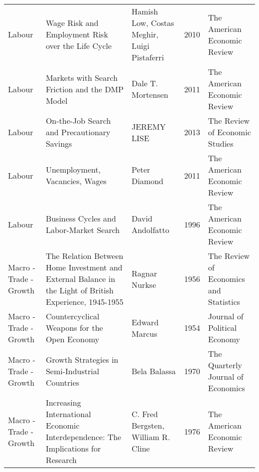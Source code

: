 \begin{xltabular}[p]{\hsize}{sYsrs}
                         Labour &                                                                               Wage Risk and Employment Risk over the Life Cycle &                   Hamish Low, Costas Meghir, Luigi Pistaferri & 2010 &           The American Economic Review \\
                         Labour &                                                                                  Markets with Search Friction and the DMP Model &                                             Dale T. Mortensen & 2011 &           The American Economic Review \\
                         Labour &                                                                                     On-the-Job Search and Precautionary Savings &                                                   JEREMY LISE & 2013 &         The Review of Economic Studies \\
                         Labour &                                                                                                  Unemployment, Vacancies, Wages &                                                 Peter Diamond & 2011 &           The American Economic Review \\
                         Labour &                                                                                         Business Cycles and Labor-Market Search &                                              David Andolfatto & 1996 &           The American Economic Review \\
         Macro - Trade - Growth &                         The Relation Between Home Investment and External Balance in the Light of British Experience, 1945-1955 &                                                 Ragnar Nurkse & 1956 & The Review of Economics and Statistics \\
         Macro - Trade - Growth &                                                                                    Countercyclical Weapons for the Open Economy &                                                 Edward Marcus & 1954 &           Journal of Political Economy \\
         Macro - Trade - Growth &                                                                                  Growth Strategies in Semi-Industrial Countries &                                                  Bela Balassa & 1970 &     The Quarterly Journal of Economics \\
         Macro - Trade - Growth &                                                Increasing International Economic Interdependence: The Implications for Research &                            C. Fred Bergsten, William R. Cline & 1976 &           The American Economic Review \\

\end{xltabular}
